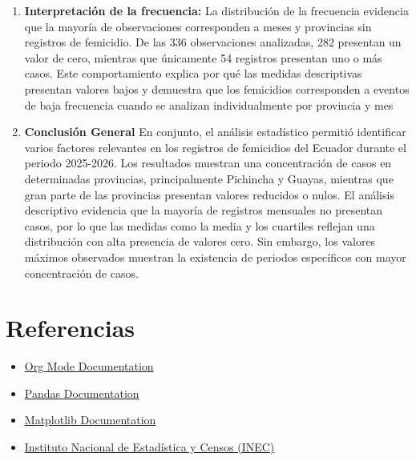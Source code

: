 \documentclass[11pt]{article}
\begin{document}
\begin{enumerate}
eventos presenta cambios entre meses, pero debido al tamaño del
periodo analizado no es posible establecer una tendencia histórica.
\item \textbf{\textbf{Interpretación de la frecuencia:}}
La distribución de la frecuencia evidencia que la mayoría de
observaciones corresponden a meses y provincias sin registros de
femicidio. De las 336 observaciones analizadas, 282 presentan un
valor de cero, mientras que únicamente 54 registros presentan uno o
más casos.
Este comportamiento explica por qué las medidas descriptivas
presentan valores bajos y demuestra que los femicidios corresponden
a eventos de baja frecuencia cuando se analizan individualmente por
provincia y mes
\item \textbf{\textbf{Conclusión General}}
En conjunto, el análisis estadístico permitió identificar varios
factores relevantes en los registros de femicidios del Ecuador
durante el periodo 2025-2026. Los resultados muestran una
concentración de casos en determinadas provincias, principalmente
Pichincha y Guayas, mientras que gran parte de las provincias
presentan valores reducidos o nulos.
El análisis descriptivo evidencia que la mayoría de registros
mensuales no presentan casos, por lo que las medidas como la media
y los cuartiles reflejan una distribución con alta presencia de
valores cero. Sin embargo, los valores máximos observados muestran
la existencia de periodos específicos con mayor concentración de
casos.
\end{enumerate}

\section{Referencias}
\label{sec:orgc483515}

\begin{itemize}
\item \href{https://orgmode.org/}{Org Mode Documentation}
\item \href{https://pandas.pydata.org/docs/}{Pandas Documentation}
\item \href{https://matplotlib.org/stable/}{Matplotlib Documentation}
\item \href{https://www.ecuadorencifras.gob.ec/}{Instituto Nacional de Estadística y Censos (INEC)}
\end{itemize}
\end{document}
